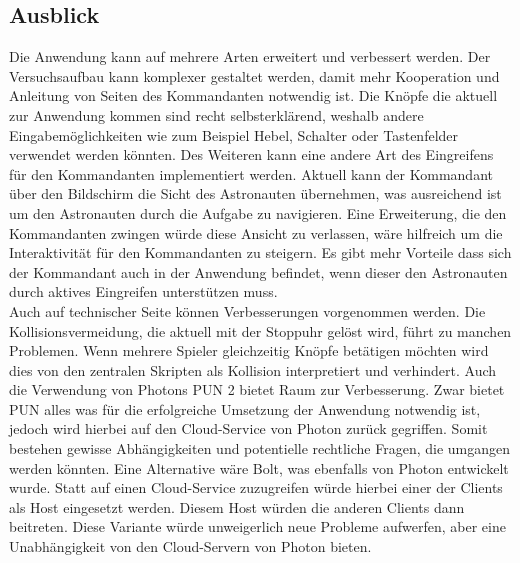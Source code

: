 \subsection{Ausblick} \label{Ausblick}

Die Anwendung kann auf mehrere Arten erweitert und verbessert werden. Der Versuchsaufbau kann komplexer gestaltet werden, damit mehr Kooperation und Anleitung von Seiten des Kommandanten notwendig ist. Die Knöpfe die aktuell zur Anwendung kommen sind recht selbsterklärend, weshalb andere Eingabemöglichkeiten wie zum Beispiel Hebel, Schalter oder Tastenfelder verwendet werden könnten. Des Weiteren kann eine andere Art des Eingreifens für den Kommandanten implementiert werden. Aktuell kann der Kommandant über den Bildschirm die Sicht des Astronauten übernehmen, was ausreichend ist um den Astronauten durch die Aufgabe zu navigieren. Eine Erweiterung, die den Kommandanten zwingen würde diese Ansicht zu verlassen, wäre hilfreich um die Interaktivität für den Kommandanten zu steigern. Es gibt mehr Vorteile dass sich der Kommandant auch in der Anwendung befindet, wenn dieser den Astronauten durch aktives Eingreifen unterstützen muss.\\

Auch auf technischer Seite können Verbesserungen vorgenommen werden. Die Kollisionsvermeidung, die aktuell mit der Stoppuhr gelöst wird, führt zu manchen Problemen. Wenn mehrere Spieler gleichzeitig Knöpfe betätigen möchten wird dies von den zentralen Skripten als Kollision interpretiert und verhindert. Auch die Verwendung von Photons PUN 2 bietet Raum zur Verbesserung. Zwar bietet PUN alles was für die erfolgreiche Umsetzung der Anwendung notwendig ist, jedoch wird hierbei auf den Cloud-Service von Photon zurück gegriffen. Somit bestehen gewisse Abhängigkeiten und potentielle rechtliche Fragen, die umgangen werden könnten. Eine Alternative wäre Bolt, was ebenfalls von Photon entwickelt wurde. Statt auf einen Cloud-Service zuzugreifen würde hierbei einer der Clients als Host eingesetzt werden. Diesem Host würden die anderen Clients dann beitreten. Diese Variante würde unweigerlich neue Probleme aufwerfen, aber eine Unabhängigkeit von den Cloud-Servern von Photon bieten.\\

